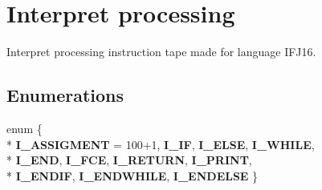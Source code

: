 \hypertarget{group__interpret__processing}{}\section{Interpret processing}
\label{group__interpret__processing}


Interpret processing instruction tape made for language I\+F\+J16.  


\subsection*{Enumerations}
\begin{DoxyCompactItemize}
\item 
enum \{ \\*
{\bfseries I\+\_\+\+A\+S\+S\+I\+G\+M\+E\+NT} = 100+1, 
{\bfseries I\+\_\+\+IF}, 
{\bfseries I\+\_\+\+E\+L\+SE}, 
{\bfseries I\+\_\+\+W\+H\+I\+LE}, 
\\*
{\bfseries I\+\_\+\+E\+ND}, 
{\bfseries I\+\_\+\+F\+CE}, 
{\bfseries I\+\_\+\+R\+E\+T\+U\+RN}, 
{\bfseries I\+\_\+\+P\+R\+I\+NT}, 
\\*
{\bfseries I\+\_\+\+E\+N\+D\+IF}, 
{\bfseries I\+\_\+\+E\+N\+D\+W\+H\+I\+LE}, 
{\bfseries I\+\_\+\+E\+N\+D\+E\+L\+SE}
 \}
\end{DoxyCompactItemize}
